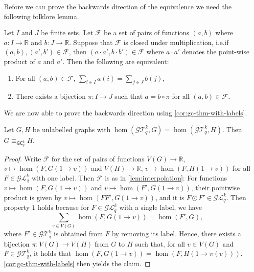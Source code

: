 \documentclass{lmcs}
\theoremstyle{plain}\newtheorem{claim}[thm]{Claim}   %
\newcommand{\cG}{\ensuremath{\mathcal G}}
\newcommand{\cL}{\ensuremath{\mathcal L}}
\newcommand{\cT}{\ensuremath{\mathcal T}}
\newcommand{\Ekq}{\ensuremath{\cT_{q}^{k}}}
\newcommand{\Lkq}{\ensuremath{\cL_{q}^{k}}}
\newcommand{\GEkq}{\ensuremath{\cG\Lkq}}
\newcommand{\GEkqLL}{\ensuremath{\cG\Ekq}}
\newcommand{\lGC}{\ensuremath{\mathsf{GC}}}
\begin{document}
Before we can prove the backwards direction of the equivalence we need the following folklore lemma.

\begin{lem} \label{lem:interpolation}
	Let $I$ and $J$ be finite sets.
	Let $\mathcal{F}$ be a set of pairs of functions $(a, b)$ where $a \colon I \to \mathbb{R}$ and $b \colon J \to \mathbb{R}$.
	Suppose that $\mathcal{F}$ is closed under multiplication, i.e.\@ if $(a, b), (a', b') \in \mathcal{F}$, then $(a \cdot a', b \cdot b') \in \mathcal{F}$ where $a \cdot a'$ denotes the point-wise product of $a$ and $a'$.
	Then the following are equivalent:
	\begin{enumerate}
		\item For all $(a, b) \in \mathcal{F}$, $\sum_{i \in I} a(i) = \sum_{j \in J} b(j)$,
		\item There exists a bijection $\pi \colon I \to J$ such that $a = b \circ \pi$ for all $(a,b) \in \mathcal{F}$.
	\end{enumerate}
\end{lem}

We are now able to prove the backwards direction using \autoref{cor:gc-thm-with-labels}.

\begin{lem}\label{lem:labelsBw}
	Let $G, H$ be unlabelled graphs with $\hom(\GEkqLL, G) = \hom(\GEkqLL, H)$.
	Then $G \equiv_{\lGC^k_q} H$.
\end{lem}
\begin{proof}
	Write $\mathcal{F} $ for the set of pairs of functions $V(G) \to \mathbb{R}$, $v \mapsto \hom(F, G(1 \to v))$ and $V(H) \to \mathbb{R}$, $v \mapsto \hom(F, H(1 \to v))$ for all $F \in \GEkq$ with one label.
	Then $\mathcal{F}$ is as in \autoref{lem:interpolation}: For functions $v \mapsto \hom(F, G(1 \to v))$ and $v \mapsto \hom(F', G(1 \to v))$, their pointwise product is given by $v \mapsto \hom(FF', G(1 \to v))$, and it is $F \odot F' \in \GEkq$.
	Then property $1$ holds because for $F \in \GEkq$ with a single label, we have \[\sum_{v \in V(G)} \hom(F, G(1 \to v)) = \hom(F', G),\] where $F' \in \GEkqLL$ is obtained from $F$ by removing its label.
	Hence, there exists a bijection $\pi \colon V(G) \to V(H)$ from $G$ to $H$ such that, for all $v \in V(G)$ and $F \in \GEkqLL$, it holds that $\hom(F, G(1 \to v)) = \hom(F, H(1 \to \pi(v)))$.
	\autoref{cor:gc-thm-with-labels} then yields the claim.
\end{proof}
\end{document}
